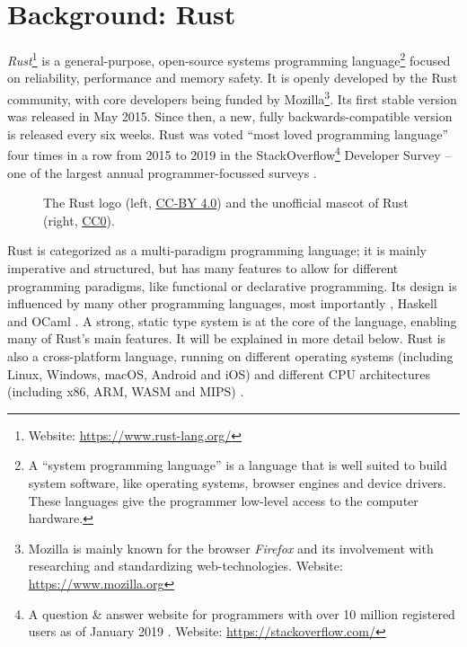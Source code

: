 \chapter{Background: Rust}

\emph{Rust}\footnote{Website: \url{https://www.rust-lang.org/}} is a general-purpose, open-source systems programming language\footnote{A \enquote{system programming language} is a language that is well suited to build system software, like operating systems, browser engines and device drivers. These languages give the programmer low-level access to the computer hardware.} focused on reliability, performance and memory safety.
It is openly developed by the Rust community, with core developers being funded by Mozilla\footnote{Mozilla is mainly known for the browser \emph{Firefox} and its involvement with researching and standardizing web-technologies. Website: \url{https://www.mozilla.org}}.
Its first stable version was released in May 2015.
Since then, a new, fully backwards-compatible version is released every six weeks.
Rust was voted \enquote{most loved programming language} four times in a row from 2015 to 2019 in the StackOverflow\footnote{A question \& answer website for programmers with over 10 million registered users as of January 2019 \cite{so-user-count}. Website: \url{https://stackoverflow.com/}} Developer Survey -- one of the largest annual programmer-focussed surveys \cite{so-survey}.

\begin{figure}[h]
  \vspace{5mm}
  \centering
  
  \caption{The Rust logo (left, \protect\hyperlink{cc-by}{CC-BY 4.0}) and the unofficial mascot of Rust (right, \protect\hyperlink{cc0}{CC0}).}
  \vspace{5mm}
\end{figure}

Rust is categorized as a multi-paradigm programming language; it is mainly imperative and structured, but has many features to allow for different programming paradigms, like functional or declarative programming.
Its design is influenced by many other programming languages, most importantly \cpp, Haskell and OCaml \cite{rust-influences}.
A strong, static type system is at the core of the language, enabling many of Rust's main features.
It will be explained in more detail below.
Rust is also a cross-platform language, running on different operating systems (including Linux, Windows, macOS, Android and iOS) and different CPU architectures (including x86, ARM, WASM and MIPS) \cite{rust-platforms}.

